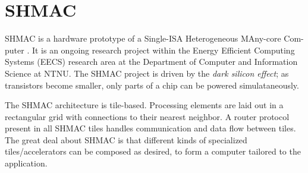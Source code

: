 \section{SHMAC}

SHMAC is a hardware prototype of a Single-ISA Heterogeneous MAny-core Com-
puter \cite{shmacsliedes, shmacwebpage}. It is an ongoing research project within the Energy Efficient Computing
Systems (EECS) research area at the Department of Computer and Information
Science at NTNU. The SHMAC project is driven by the \textit{dark silicon
effect}; as transistors become smaller, only parts of a chip can be powered
simulataneously.

The SHMAC architecture is tile-based. Processing elements are laid out in a
rectangular grid with connections to their nearest neighbor. A router protocol
present in all SHMAC tiles handles communication and data flow between tiles.
The great deal about SHMAC is that different kinds of specialized
tiles/accelerators can be composed as desired, to form a computer tailored to
the application.
